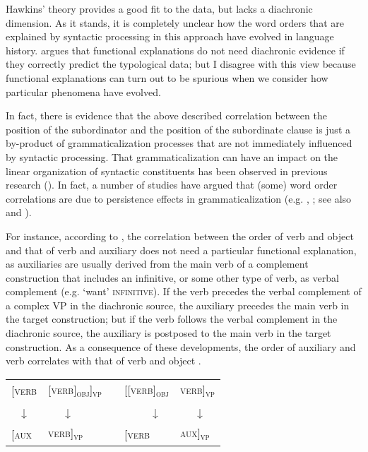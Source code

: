 \documentclass[output=paper]{langsci/langscibook}
\begin{document}
Hawkins’ theory provides a good fit to the data, but lacks a diachronic dimension. As it stands, it is completely unclear how the word orders that are explained by syntactic processing in this approach have evolved in language history.  argues that functional explanations do not need diachronic evidence if they correctly predict the typological data; but I disagree with this view because functional explanations can turn out to be spurious when we consider how particular phenomena have evolved.

In fact, there is evidence that the above described correlation between the position of the subordinator and the position of the subordinate clause is just a by-product of grammaticalization processes that are not immediately influenced by syntactic processing. That grammaticalization can have an impact on the linear organization of syntactic constituents has been observed in previous research (\citealt{Li1974_Chin}). In fact, a number of studies have argued that (some) word order correlations are due to persistence effects in grammaticalization (e.g. \citealt{Givón1975}, \citealt{Aristar1991,Bybee2010,Collins2012}; see also  and ). 

For instance, according to \citet[111]{Bybee2010}, the correlation between the order of verb and object and that of verb and auxiliary does not need a particular functional explanation, as auxiliaries are usually derived from the main verb of a complement construction that includes an infinitive, or some other type of verb, as verbal complement (e.g. `want' \textsc{infinitive}). If the verb precedes the verbal complement of a complex VP in the diachronic source, the auxiliary precedes the main verb in the target construction; but if the verb follows the verbal complement in the diachronic source, the auxiliary is postposed to the main verb in the target construction. As a consequence of these developments, the order of auxiliary and verb correlates with that of verb and object .

\ea\label{ex:diessel:18}
\begin{tabular}[t]{@{}llcll@{}}
{[\textsc{verb}} & {\textsc{[verb]\textsubscript{obj}]\textsubscript{vp}}} & \hspace{2cm} & {\textsc{[[verb]\textsubscript{obj}}} & {\textsc{verb]\textsubscript{vp}}} \\
\multicolumn{1}{c}{↓}  & ~~~↓ & & ~~~~~↓ & ~~~↓\\
{\textsc{[aux}}  & {\textsc{verb]\textsubscript{vp}}}                      &  & {\textsc{[verb}}  & {\textsc{aux]\textsubscript{vp}}}\\
\end{tabular}
\z
\end{document}
